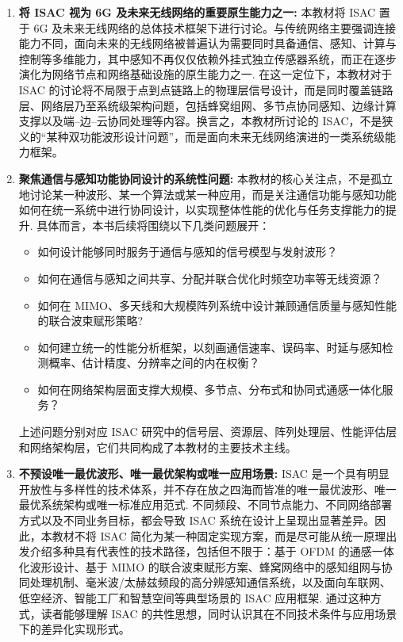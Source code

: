 \begin{enumerate}[label=(\arabic*)]
    \item \textbf{将 ISAC 视为 6G 及未来无线网络的重要原生能力之一:}
    本教材将 ISAC 置于 6G 及未来无线网络的总体技术框架下进行讨论。与传统网络主要强调连接能力不同，面向未来的无线网络被普遍认为需要同时具备通信、感知、计算与控制等多维能力，其中感知不再仅仅依赖外挂式独立传感器系统，而正在逐步演化为网络节点和网络基础设施的原生能力之一\cite{Liu2022ISAC,Gonzalez2024integrated,Saad2020Vision6G}. 在这一定位下，本教材对于 ISAC 的讨论将不局限于点到点链路上的物理层信号设计，而是同时覆盖链路层、网络层乃至系统级架构问题，包括蜂窝组网、多节点协同感知、边缘计算支撑以及端--边--云协同处理等内容。换言之，本教材所讨论的 ISAC，不是狭义的“某种双功能波形设计问题”，而是面向未来无线网络演进的一类系统级能力框架。
    \item \textbf{聚焦通信与感知功能协同设计的系统性问题:}
    本教材的核心关注点，不是孤立地讨论某一种波形、某一个算法或某一种应用，而是关注通信功能与感知功能如何在统一系统中进行协同设计，以实现整体性能的优化与任务支撑能力的提升\cite{Liu2020JointRadarComm,Zhang2021ISAC6G}. 具体而言，本书后续将围绕以下几类问题展开：
    \begin{itemize}
        \item 如何设计能够同时服务于通信与感知的信号模型与发射波形？
        \item 如何在通信与感知之间共享、分配并联合优化时频空功率等无线资源？
        \item 如何在 MIMO、多天线和大规模阵列系统中设计兼顾通信质量与感知性能的联合波束赋形策略?
        \item 如何建立统一的性能分析框架，以刻画通信速率、误码率、时延与感知检测概率、估计精度、分辨率之间的内在权衡？
        \item 如何在网络架构层面支撑大规模、多节点、分布式和协同式通感一体化服务？
    \end{itemize}
    上述问题分别对应 ISAC 研究中的信号层、资源层、阵列处理层、性能评估层和网络架构层，它们共同构成了本教材的主要技术主线。
    \item \textbf{不预设唯一最优波形、唯一最优架构或唯一应用场景:}
    ISAC 是一个具有明显开放性与多样性的技术体系，并不存在放之四海而皆准的唯一最优波形、唯一最优系统架构或唯一标准应用范式\cite{Liu2022ISAC,Liu2020JointRadarComm}. 不同频段、不同节点能力、不同网络部署方式以及不同业务目标，都会导致 ISAC 系统在设计上呈现出显著差异。因此，本教材不将 ISAC 简化为某一种固定实现方案，而是尽可能从统一原理出发介绍多种具有代表性的技术路径，包括但不限于：基于 OFDM 的通感一体化波形设计、基于 MIMO 的联合波束赋形方案、蜂窝网络中的感知组网与协同处理机制、毫米波/太赫兹频段的高分辨感知通信系统，以及面向车联网、低空经济、智能工厂和智慧空间等典型场景的 ISAC 应用框架\cite{Liu2022ISAC,Gonzalez2024integrated}. 通过这种方式，读者能够理解 ISAC 的共性思想，同时认识其在不同技术条件与应用场景下的差异化实现形式。
\end{enumerate}
